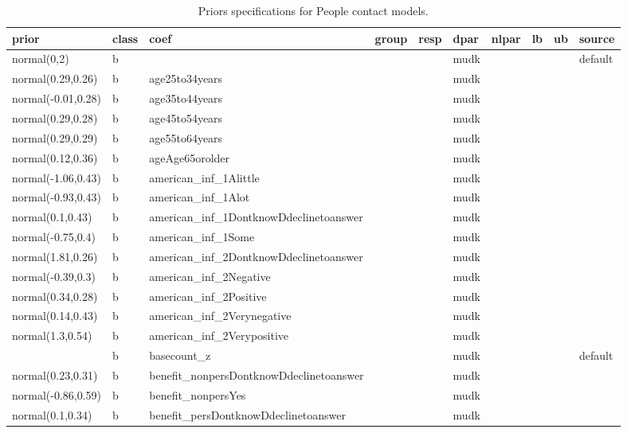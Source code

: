 \documentclass[
]{book}
\theoremstyle{definition}
\theoremstyle{definition}
\theoremstyle{definition}
\theoremstyle{definition}
\theoremstyle{remark}
\begin{document}
\begin{table}

\caption{\label{tab:prior-info-crime-people}Priors specifications for People contact models.}
\centering
\fontsize{11}{13}\selectfont
\begin{tabular}[t]{l|l|l|l|l|l|l|l|l|l}
\hline
prior & class & coef & group & resp & dpar & nlpar & lb & ub & source\\
\hline
normal(0,2) & b &  &  &  & mudk &  &  &  & default\\
\hline
normal(0.29,0.26) & b & age25to34years &  &  & mudk &  &  &  & \\
\hline
normal(-0.01,0.28) & b & age35to44years &  &  & mudk &  &  &  & \\
\hline
normal(0.29,0.28) & b & age45to54years &  &  & mudk &  &  &  & \\
\hline
normal(0.29,0.29) & b & age55to64years &  &  & mudk &  &  &  & \\
\hline
normal(0.12,0.36) & b & ageAge65orolder &  &  & mudk &  &  &  & \\
\hline
normal(-1.06,0.43) & b & american\_inf\_1Alittle &  &  & mudk &  &  &  & \\
\hline
normal(-0.93,0.43) & b & american\_inf\_1Alot &  &  & mudk &  &  &  & \\
\hline
normal(0.1,0.43) & b & american\_inf\_1DontknowDdeclinetoanswer &  &  & mudk &  &  &  & \\
\hline
normal(-0.75,0.4) & b & american\_inf\_1Some &  &  & mudk &  &  &  & \\
\hline
normal(1.81,0.26) & b & american\_inf\_2DontknowDdeclinetoanswer &  &  & mudk &  &  &  & \\
\hline
normal(-0.39,0.3) & b & american\_inf\_2Negative &  &  & mudk &  &  &  & \\
\hline
normal(0.34,0.28) & b & american\_inf\_2Positive &  &  & mudk &  &  &  & \\
\hline
normal(0.14,0.43) & b & american\_inf\_2Verynegative &  &  & mudk &  &  &  & \\
\hline
normal(1.3,0.54) & b & american\_inf\_2Verypositive &  &  & mudk &  &  &  & \\
\hline
 & b & basecount\_z &  &  & mudk &  &  &  & default\\
\hline
normal(0.23,0.31) & b & benefit\_nonpersDontknowDdeclinetoanswer &  &  & mudk &  &  &  & \\
\hline
normal(-0.86,0.59) & b & benefit\_nonpersYes &  &  & mudk &  &  &  & \\
\hline
normal(0.1,0.34) & b & benefit\_persDontknowDdeclinetoanswer &  &  & mudk &  &  &  & \\

\end{tabular}
\end{table}
\end{document}
